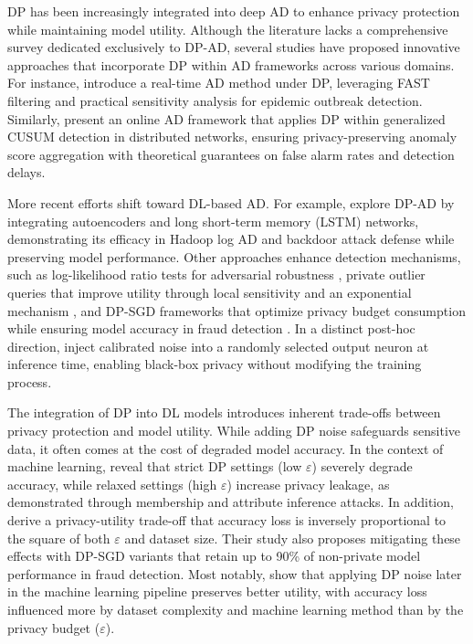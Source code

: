 DP has been increasingly integrated into deep AD to enhance privacy protection while maintaining model utility. Although the literature lacks a comprehensive survey dedicated exclusively to DP-AD, several studies have proposed innovative approaches that incorporate DP within AD frameworks across various domains. For instance, \cite{fan2013differentially} introduce a real-time AD method under DP, leveraging FAST filtering and practical sensitivity analysis for epidemic outbreak detection. Similarly, \cite{kurt2022online} present an online AD framework that applies DP within generalized CUSUM detection in distributed networks, ensuring privacy-preserving anomaly score aggregation with theoretical guarantees on false alarm rates and detection delays.

More recent efforts shift toward DL-based AD. For example, \cite{du2019robust} explore DP-AD by integrating autoencoders and long short-term memory (LSTM) networks, demonstrating its efficacy in Hadoop log AD and backdoor attack defense while preserving model performance. Other approaches enhance detection mechanisms, such as log-likelihood ratio tests for adversarial robustness \cite{giraldo2020adversarial}, private outlier queries that improve utility through local sensitivity and an exponential mechanism \cite{okada2015differentially}, and DP-SGD frameworks that optimize privacy budget consumption while ensuring model accuracy in fraud detection \cite{wang2018privacy}. In a distinct post-hoc direction, \cite{lu2022differentially} inject calibrated noise into a randomly selected output neuron at inference time, enabling black-box privacy without modifying the training process.

The integration of DP into DL models introduces inherent trade-offs between privacy protection and model utility. While adding DP noise safeguards sensitive data, it often comes at the cost of degraded model accuracy. In the context of machine learning, \cite{jayaraman2019evaluating} reveal that strict DP settings (low $\varepsilon$) severely degrade accuracy, while relaxed settings (high $\varepsilon$) increase privacy leakage, as demonstrated through membership and attribute inference attacks. In addition, \cite{wu2020value} derive a privacy-utility trade-off that accuracy loss is inversely proportional to the square of both $\varepsilon$ and dataset size. Their study also proposes mitigating these effects with DP-SGD variants that retain up to 90\% of non-private model performance in fraud detection. Most notably, \cite{zhao2020not} show that applying DP noise later in the machine learning pipeline preserves better utility, with accuracy loss influenced more by dataset complexity and machine learning method than by the privacy budget ($\varepsilon$).

